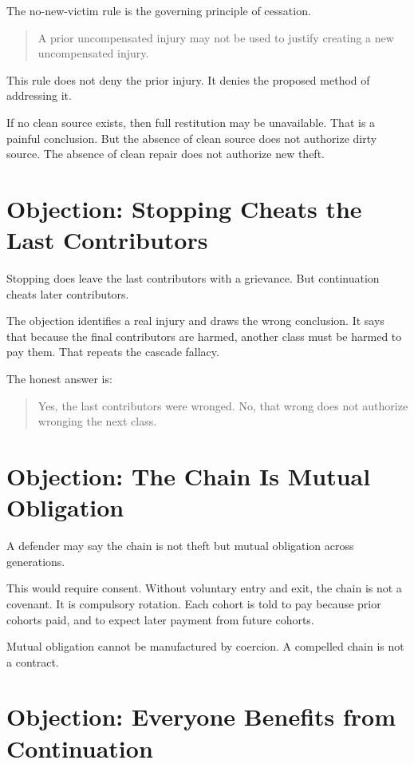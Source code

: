 \documentclass[12pt]{article}
\begin{document}
The no-new-victim rule is the governing principle of cessation.

\begin{quote}
A prior uncompensated injury may not be used to justify creating a new uncompensated injury.
\end{quote}

This rule does not deny the prior injury. It denies the proposed method of addressing it.

If no clean source exists, then full restitution may be unavailable. That is a painful conclusion. But the absence of clean source does not authorize dirty source. The absence of clean repair does not authorize new theft.

\section{Objection: Stopping Cheats the Last Contributors}

Stopping does leave the last contributors with a grievance. But continuation cheats later contributors.

The objection identifies a real injury and draws the wrong conclusion. It says that because the final contributors are harmed, another class must be harmed to pay them. That repeats the cascade fallacy.

The honest answer is:

\begin{quote}
Yes, the last contributors were wronged. No, that wrong does not authorize wronging the next class.
\end{quote}

\section{Objection: The Chain Is Mutual Obligation}

A defender may say the chain is not theft but mutual obligation across generations.

This would require consent. Without voluntary entry and exit, the chain is not a covenant. It is compulsory rotation. Each cohort is told to pay because prior cohorts paid, and to expect later payment from future cohorts.

Mutual obligation cannot be manufactured by coercion. A compelled chain is not a contract.

\section{Objection: Everyone Benefits from Continuation}
\end{document}
